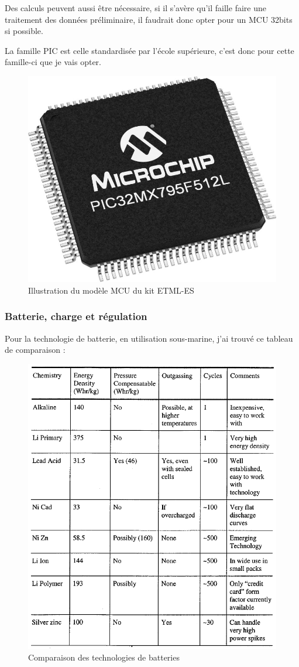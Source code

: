 {{    
    Des calculs peuvent aussi être nécessaire, si il s'avère qu'il faille faire une traitement des données préliminaire, il faudrait donc opter pour un MCU 32bits si possible.


    La famille PIC est celle standardisée par l'école supérieure, c'est donc pour cette famille-ci que je vais opter.
    \vspace{+12pt} \\

    \begin{figure}[h] 
        \centering
        \includegraphics[width=.4\textwidth]{Figures/PIC32MX795F512L-V7X-Regular}
        \caption{Illustration du modèle MCU du kit ETML-ES}
        \label{fig:MCU}
    \end{figure}
    
}

\clearpage

\subsubsection{Batterie, charge et régulation}
{

Pour la technologie de batterie, en utilisation sous-marine, j'ai trouvé ce tableau de comparaison :

\begin{figure}[h]
    \centering
    \includegraphics[width=.56\textwidth]{Figures/PowerSystemsComparison}
    \caption{Comparaison des technologies de batteries}
    \label{fig:BatteriesComparaisons}
\end{figure}

}}
